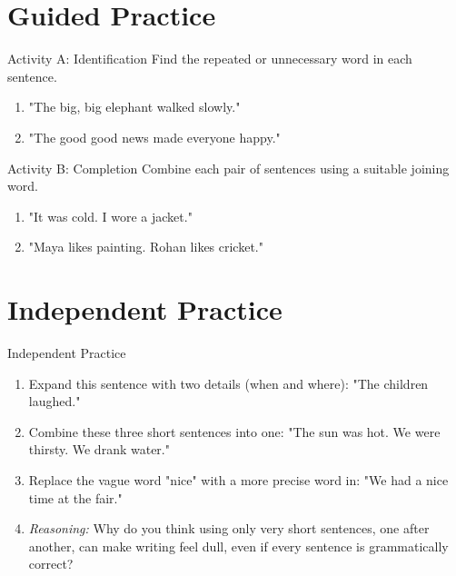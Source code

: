 \section{Guided Practice}
\begin{activitybox}{Activity A: Identification}
Find the repeated or unnecessary word in each sentence.
\begin{enumerate}
    \item "The big, big elephant walked slowly."
    \item "The good good news made everyone happy."
\end{enumerate}
\end{activitybox}

\begin{activitybox}{Activity B: Completion}
Combine each pair of sentences using a suitable joining word.
\begin{enumerate}
    \item "It was cold. I wore a jacket."
    \item "Maya likes painting. Rohan likes cricket."
\end{enumerate}
\end{activitybox}

\section{Independent Practice}
\begin{activitybox}{Independent Practice}
\begin{enumerate}
    \item Expand this sentence with two details (when and where): "The children laughed."
    \item Combine these three short sentences into one: "The sun was hot. We were thirsty. We drank water."
    \item Replace the vague word "nice" with a more precise word in: "We had a nice time at the fair."
    \item \textit{Reasoning:} Why do you think using only very short sentences, one after another, can make writing feel dull, even if every sentence is grammatically correct?
\end{enumerate}
\end{activitybox}


